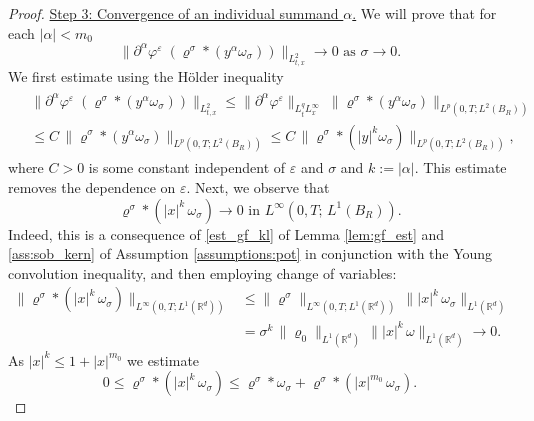 \documentclass[reqno, 11pt]{amsart}
\numberwithin{equation}{section}
\theoremstyle{definition}
\begin{document}
\begin{proof}
    \underline{Step 3: Convergence of an individual summand $\alpha$.} We will prove that for each $|\alpha|< m_0$
    \begin{equation}\label{eq:step3_commutator_estimate_not_weighted}
        \|\partial^\alpha\varphi^\varepsilon\; (\varrho^\sigma\ast (y^\alpha \omega_\sigma))\|_{L_{t,x}^2} \to 0 \mbox{ as } \sigma \to 0.
    \end{equation}
    We first estimate using the H\"older inequality
    \begin{align}
        \label{eq:est_sum_alpha}
        \begin{split}
            &\|\partial^\alpha\varphi^\varepsilon\; (\varrho^\sigma\ast (y^\alpha \omega_\sigma))\|_{L_{t,x}^2}
            \leq \|\partial^\alpha\varphi^\varepsilon\|_{L_t^q L_x^\infty}\;\|\varrho^\sigma\ast (y^\alpha \omega_\sigma)\|_{L^p(0,T;L^2(B_R))}\\
            &\leq C\,\|\varrho^\sigma\ast (y^\alpha \omega_\sigma)\|_{L^p(0,T;L^2(B_R))} \leq C\,\|\varrho^\sigma\ast (|y|^k \omega_\sigma)\|_{L^p(0,T;L^2(B_R))},
        \end{split}
    \end{align}
    where $C>0$ is some constant independent of $\varepsilon$ and $\sigma$ and $k:=|\alpha|$. This estimate removes the dependence on $\varepsilon$. Next, we observe that
    \begin{equation}\label{eq:claim_conv_in_measure}
        \varrho^\sigma \ast (|x|^{k}\,\omega_\sigma) \to 0 \mbox{ in }L^\infty(0,T;\, L^1(B_R)).
    \end{equation}
    Indeed, this is a consequence of \ref{est_gf_kl} of Lemma \ref{lem:gf_est} and \ref{ass:sob_kern} of Assumption \ref{assumptions:pot} in conjunction with the Young convolution inequality, and then employing change of variables:
    \begin{align*}
        \| \varrho^\sigma \ast (|x|^{k}\,\omega_\sigma)\|_{L^{\infty}(0,T; L^1(\mathbb{R}^d))} &\leq \| \varrho^\sigma \|_{L^{\infty}(0,T; L^1(\mathbb{R}^d))} \, \| |x|^{k}\,\omega_\sigma \|_{L^1(\mathbb{R}^d)} \\
        &=\sigma^k\,\|\varrho_0\|_{L^1(\mathbb{R}^d)} \, \||x|^{k} \, \omega\|_{L^1(\mathbb{R}^d)} \to 0.
    \end{align*}
    As $|x|^k \leq 1 + |x|^{m_0}$ we estimate
    \begin{equation}\label{eq:sequence_of_interest_pointwise_bound}
        0 \leq \varrho^\sigma \ast (|x|^{k}\,\omega_\sigma)  \leq   \varrho^\sigma\ast\omega_\sigma +  \varrho^\sigma \ast (|x|^{m_0}\,\omega_\sigma) .

\end{equation}
\end{proof}
\end{document}
